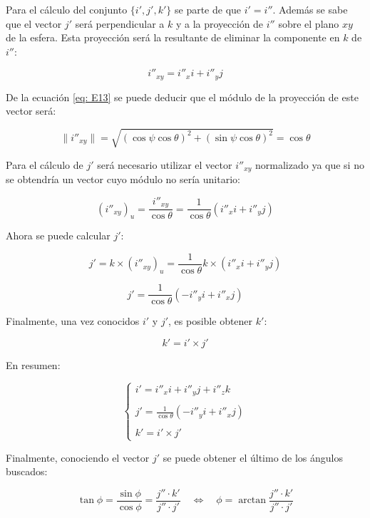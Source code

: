 \documentclass[10pt, a4paper]{report}
\begin{document}
Para el cálculo del conjunto $\{i', j', k'\}$ se parte de que $i' = i''$. Además se sabe que el vector $j'$ será perpendicular a $k$ y a la proyección de $i''$ sobre el plano $xy$ de la esfera. Esta proyección será la resultante de eliminar la componente en $k$ de $i''$:

$$ i''_{xy} = i''_x i + i''_y j $$

De la ecuación \eqref{eq: E13} se puede deducir que el módulo de la proyección de este vector será:

$$ \|i''_{xy}\| = \sqrt{\left(\cos \psi \cos \theta\right)^2 + \left(\sin \psi \cos \theta \right)^2} = \cos\theta$$

Para el cálculo de $j'$ será necesario utilizar el vector $i''_{xy}$ normalizado ya que si no se obtendría un vector cuyo módulo no sería unitario: 

$$ \left( i''_{xy} \right)_u = \frac{i''_{xy}}{\cos\theta} = \frac{1}{\cos\theta}\left( i''_x i + i''_y j \right) $$

Ahora se puede calcular $j'$:

$$ j' = k \times \left( i''_{xy} \right)_u = \frac{1}{\cos\theta} k \times\left( i''_x i + i''_y j \right) $$

\begin{equation}
j' = \frac{1}{\cos\theta} \left( - i''_y i + i''_x j \right)
\end{equation}
  
Finalmente, una vez conocidos $i'$ y $j'$, es posible obtener $k'$:

$$ k' = i' \times j' $$

En resumen:

\begin{equation}
\begin{cases}
i' = i''_x i + i''_y j + i''_z k \\
\\
j' = \displaystyle\frac{1}{\cos\theta} \left( - i''_y i + i''_x j \right) \\
\\
k' = i' \times j'
\end{cases}
\end{equation}

Finalmente, conociendo el vector $j'$ se puede obtener el último de los ángulos buscados:

\begin{equation}
\tan\phi = \frac{\sin \phi}{\cos \phi} = \frac{j'' \cdot k'}{j'' \cdot j'} \quad \iff \quad \phi = \arctan \frac{j'' \cdot k'}{j'' \cdot j'}
\end{equation}
\end{document}
